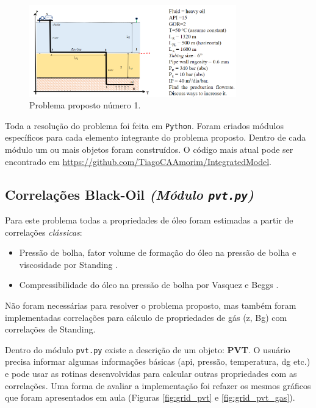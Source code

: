 \documentclass[final,3p]{elsarticle}
\numberwithin{equation}{section}
\begin{document}
        \begin{figure}
            \centering
            \includegraphics[width=0.8\textwidth]{Problem_01.png}
            \caption{Problema proposto número 1.}
            \label{fig:problema_proposto}
        \end{figure}

        Toda a resolução do problema foi feita em \texttt{Python}. Foram criados módulos específicos para cada elemento integrante do problema proposto. Dentro de cada módulo um ou mais objetos foram construídos. O código mais atual pode ser encontrado em \href{https://github.com/TiagoCAAmorim/IntegratedModel/tree/main/sample}{https://github.com/TiagoCAAmorim/IntegratedModel}.

    \subsection{Correlações Black-Oil \emph{(Módulo \texttt{pvt.py})}}

        Para este problema todas a propriedades de óleo foram estimadas a partir de correlações \emph{clássicas}:

        \begin{itemize}
            \item Pressão de bolha, fator volume de formação do óleo na pressão de bolha e viscosidade por Standing \cite{standing1952volumetric}.
            \item Compressibilidade do óleo na pressão de bolha por Vasquez e Beggs \cite{VasquezBeggs}.
        \end{itemize}

        Não foram necessárias para resolver o problema proposto, mas também foram implementadas correlações para cálculo de propriedades de gás (z, Bg) com correlações de Standing.

        Dentro do módulo \texttt{pvt.py} existe a descrição de um objeto: \textbf{PVT}. O usuário precisa informar algumas informações básicas (api, pressão, temperatura, dg etc.) e pode usar as rotinas desenvolvidas para calcular outras propriedades com as correlações. Uma forma de avaliar a implementação foi refazer os mesmos gráficos que foram apresentados em aula \cite{aula01} (Figuras \ref{fig:grid_pvt} e \ref{fig:grid_pvt_gas}).
\end{document}
